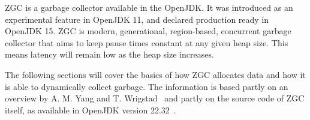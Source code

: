 
ZGC is a garbage collector available in the OpenJDK. It was introduced as an experimental feature in OpenJDK 11, and declared production ready in OpenJDK 15. ZGC is modern, generational, region-based, concurrent garbage collector that aims to keep pause times constant at any given heap size. This means latency will remain low as the heap size increases.

The following sections will cover the basics of how ZGC allocates data and how it is able to dynamically collect garbage. The information is based partly on an overview by A. M. Yang and T. Wrigstad~\cite{zgc:deep_dive} and partly on the source code of ZGC itself, as available in OpenJDK version 22.32~\cite{jdk:tag2232}.

